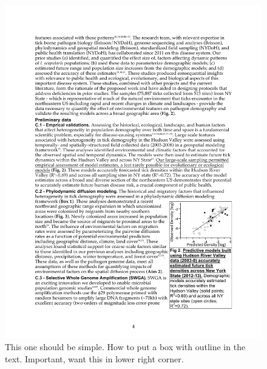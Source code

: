 \documentclass[letterpaper,12pt]{article}%
\begin{document}
\begin{figure}[h!]
\centering
\includegraphics[scale=0.7]{TightLegendWrap.pdf}
\caption{This one should be simple. How to put a box with outline in the text. Important, want this in lower right corner.}
\label{fig:TightLegendWrap}
\end{figure}
\end{document}
